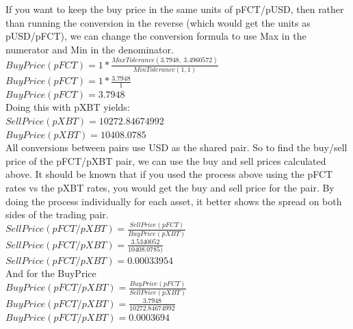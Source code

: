 \documentclass[12pt]{article}
\begin{document}
    If you want to keep the buy price in the same units of pFCT/pUSD, then rather than running the conversion in the reverse (which would get the units as pUSD/pFCT), we can change the conversion formula to use Max in the numerator and Min in the denominator.  \\[10pt]
    $BuyPrice(pFCT) = 1 * \frac{MaxTolerance(3.7948,\ 3.4960572)}{MinTolerance(1, 1)}$  \\[4pt]
    $BuyPrice(pFCT) = 1 * \frac{3.7948}{1}$  \\[4pt]
    $BuyPrice(pFCT) = 3.7948$ \\
    
    Doing this with pXBT yields: \\[10pt]
    $SellPrice(pXBT)=10272.84674992$ \\[4pt]
    $BuyPrice(pXBT)=10408.0785$ \\
    
    All conversions between pairs use USD as the shared pair. So to find the buy/sell price of the pFCT/pXBT pair, we can use the buy and sell prices calculated above. It should be known that if you used the process above using the pFCT rates vs the pXBT rates, you would get the buy and sell price for the pair. By doing the process individually for each asset, it better shows the spread on both sides of the trading pair. \\[10pt]
    $SellPrice(pFCT/pXBT) = \frac{SellPrice(pFCT)}{BuyPrice(pXBT)}$ \\[4pt]
    $SellPrice(pFCT/pXBT) = \frac{3.5340052}{10408.0785)} $ \\[4pt]
    $SellPrice(pFCT/pXBT) = 0.00033954 $ \\ 
    
    And for the BuyPrice  \\
    $BuyPrice(pFCT/pXBT) = \frac{BuyPrice(pFCT)}{SellPrice(pXBT)}$ \\[4pt]
    $BuyPrice(pFCT/pXBT) = \frac{3.7948}{10272.84674992}$ \\[4pt]
    $BuyPrice(pFCT/pXBT) = 0.0003694$

    
 
\end{document}
